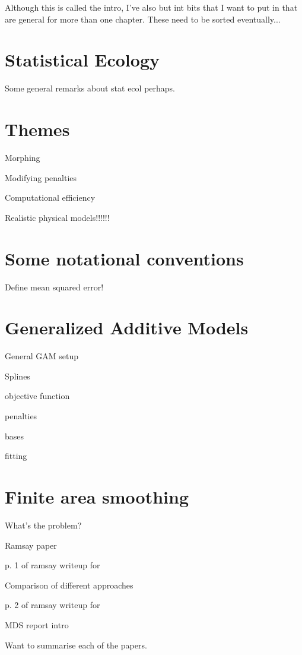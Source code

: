 Although this is called the intro, I've also but int bits that I want to put in that are general for more than one chapter. These need to be sorted eventually...

\section{Statistical Ecology}

Some general remarks about stat ecol perhaps.

\section{Themes}

\bi
	\item Morphing
	\item Modifying penalties
	\item Computational efficiency
	\item Realistic physical models!!!!!!
\ei


\section{Some notational conventions}

Define mean squared error!


\section{Generalized Additive Models}

General GAM setup

\bi
\item Splines
\item objective function
\item penalties
\item bases
\item fitting
\ei

\section{Finite area smoothing}

\bi
\item What's the problem?
\item Ramsay paper
	\bi
		\item p. 1 of ramsay writeup for \sch
	\ei
\item Comparison of different approaches
	\bi
		\item p. 2 of ramsay writeup for \sch
		\item MDS report intro
		\item Want to summarise each of the papers.
	\ei
\ei




